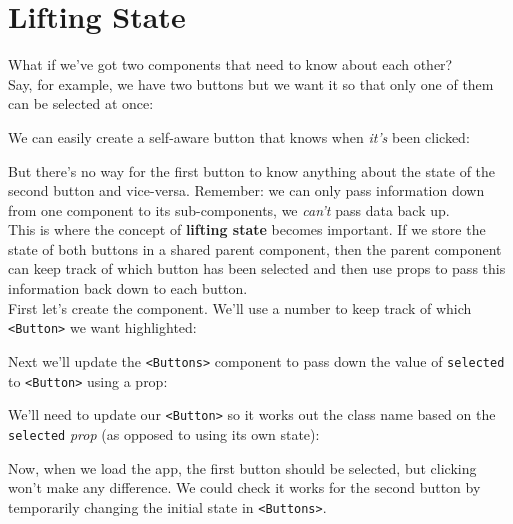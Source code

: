 \section{Lifting State}

What if we've got two components that need to know about each other?
\\

Say, for example, we have two buttons but we want it so that only one of them can be selected at once:


We can easily create a self-aware button that knows when \textit{it's} been clicked:


But there's no way for the first button to know anything about the state of the second button and vice-versa. Remember: we can only pass information down from one component to its sub-components, we \textit{can't} pass data back up.
\\


This is where the concept of \textbf{lifting state} becomes important. If we store the state of both buttons in a shared parent component, then the parent component can keep track of which button has been selected and then use props to pass this information back down to each button.
\\

First let's create the component. We'll use a number to keep track of which \texttt{<Button>} we want highlighted:



Next we'll update the \texttt{<Buttons>} component to pass down the value of \texttt{selected} to \texttt{<Button>} using a prop:


We'll need to update our \texttt{<Button>} so it works out the class name based on the \texttt{selected} \textit{prop} (as opposed to using its own state):


Now, when we load the app, the first button should be selected, but clicking won't make any difference.  We could check it works for the second button by temporarily changing the initial state in \texttt{<Buttons>}.
\\


